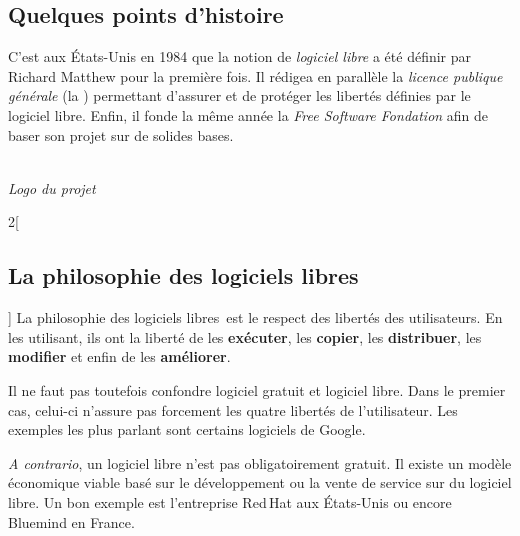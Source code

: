 \newcommand{\lls}{logiciels libres~}


\subsection{Quelques points d’histoire}
\begin{minipage}{0.7\textwidth}
C’est aux États-Unis en 1984 que la notion de \textcolor{Cdl}{\textit{logiciel libre}} a été définir par \textcolor{Cdl}{Richard Matthew } pour la première fois. Il rédigea en parallèle la \textcolor{Cdl}{\textit{licence publique générale }} (la ) permettant d’assurer et de protéger les libertés définies par le logiciel libre. Enfin, il fonde la même année la \textcolor{Cdl}{\textit{Free Software Fondation}} afin de baser son projet sur de solides bases.
\end{minipage}
\begin{minipage}{0.3\textwidth}
\begin{center}
\\
\textit{Logo du projet }
\end{center}
\end{minipage}

%


\begin{multicols}{2}[\subsection{La philosophie des logiciels libres}]
La philosophie des \lls est le respect des libertés des utilisateurs. En les utilisant, ils ont la liberté de les \textbf{exécuter}, les \textbf{copier}, les \textbf{distribuer}, les \textbf{modifier} et enfin de les \textbf{améliorer}.

Il ne faut pas toutefois confondre logiciel gratuit et logiciel libre. Dans le premier cas, celui-ci n’assure pas forcement les quatre libertés de l’utilisateur. Les exemples les plus parlant sont certains logiciels de Google.

\textit{A contrario}, un  logiciel libre n’est pas obligatoirement gratuit. Il existe un modèle économique viable basé sur le développement ou la vente de service sur du logiciel libre. Un bon exemple est l’entreprise Red\,Hat aux États-Unis ou encore Bluemind en France.
\end{multicols}

